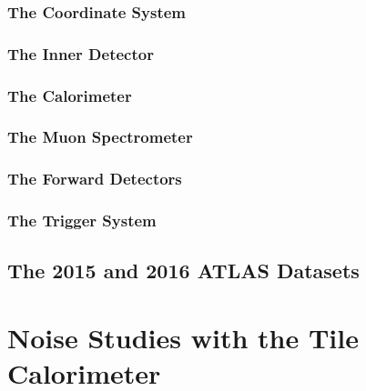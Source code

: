 \documentclass[10pt,twoside,cucitura,classica,english,openany]{toptesi}
\begin{document}


\subsection{The Coordinate System}
\label{sec:coordinate-system}



\subsection{The Inner Detector}
\label{sec:inner-detector}



\subsection{The Calorimeter}
\label{sec:calorimeters}



\subsection{The Muon Spectrometer}
\label{sec:muon-spectrometer}



\subsection{The Forward Detectors}
\label{sec:forward-detectors}



\subsection{The Trigger System}
\label{sec:trigger-system}



\section{The 2015 and 2016 ATLAS Datasets}
\label{sec:atlas-datasets}



\chapter{Noise Studies with the Tile Calorimeter}
\label{cha:noise-studies-with}
\end{document}
